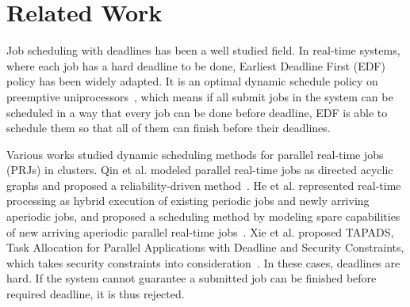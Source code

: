 \chapter{Related Work}\label{sec:related}

Job scheduling with deadlines has been a well studied field.
In real-time systems, where each job has a hard deadline to be done,
Earliest Deadline First (EDF) policy has been widely adapted.
It is an optimal dynamic schedule policy on preemptive
uniprocessors~\cite{cite:pinedo2012scheduling}, which means if all
submit jobs in the system can be scheduled in a way that every job can
be done before deadline, EDF is able to schedule them so that all of
them can finish before their deadlines.

Various works studied dynamic scheduling methods for parallel real-time
jobs (PRJs) in clusters.
Qin et al. modeled parallel real-time jobs as directed acyclic graphs
and proposed a reliability-driven
method~\cite{cite:qin-reliability-driven}.
He et al. represented real-time processing as hybrid execution of
existing periodic jobs and newly arriving aperiodic jobs, and proposed a
scheduling method by modeling spare capabilities of new arriving
aperiodic parallel real-time jobs~\cite{cite:he-spare-capabilities}.
Xie et al. proposed TAPADS, Task Allocation for Parallel Applications
with Deadline and Security Constraints, which takes security constraints
into consideration~\cite{cite:xie-TAPADS,cite:xie2008security}.
In these cases, deadlines are hard.
If the system cannot guarantee a submitted job can be finished before
required deadline, it is thus rejected.

